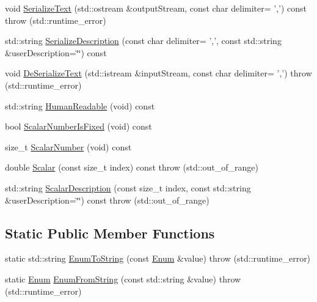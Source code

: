 \begin{DoxyCompactItemize}
\item 
void \hyperlink{classmts_component_state_a27d4817df03edad9c0fb37fd3ec5235e}{Serialize\-Text} (std\-::ostream \&output\-Stream, const char delimiter= ',') const   throw (std\-::runtime\-\_\-error)
\item 
std\-::string \hyperlink{classmts_component_state_a26daef23e5f1a036728b0b14b9e8efc0}{Serialize\-Description} (const char delimiter= ',', const std\-::string \&user\-Description=\char`\"{}\char`\"{}) const 
\item 
void \hyperlink{classmts_component_state_a5be1810d0081c6bd88eabd7ba133cd3d}{De\-Serialize\-Text} (std\-::istream \&input\-Stream, const char delimiter= ',')  throw (std\-::runtime\-\_\-error)
\item 
std\-::string \hyperlink{classmts_component_state_a372b7626577a0578549f39af8ec4f788}{Human\-Readable} (void) const 
\item 
bool \hyperlink{classmts_component_state_af8090a197fd5b545a9da6c0f4ae00bdf}{Scalar\-Number\-Is\-Fixed} (void) const 
\item 
size\-\_\-t \hyperlink{classmts_component_state_a57ed439d6865af04c20a3a561b96be9d}{Scalar\-Number} (void) const 
\item 
double \hyperlink{classmts_component_state_a65e258793958233b43d67c91fd9e3f2c}{Scalar} (const size\-\_\-t index) const   throw (std\-::out\-\_\-of\-\_\-range)
\item 
std\-::string \hyperlink{classmts_component_state_ac6de4699d77e38e562e7fa887524d77b}{Scalar\-Description} (const size\-\_\-t index, const std\-::string \&user\-Description=\char`\"{}\char`\"{}) const   throw (std\-::out\-\_\-of\-\_\-range)
\end{DoxyCompactItemize}
\subsection*{Static Public Member Functions}
\begin{DoxyCompactItemize}
\item 
static std\-::string \hyperlink{classmts_component_state_a5ca8cf9c8a890e2b25accfc4876701bf}{Enum\-To\-String} (const \hyperlink{classmts_component_state_a1158e4d2d79fff671354909e87f58928}{Enum} \&value)  throw (std\-::runtime\-\_\-error)
\item 
static \hyperlink{classmts_component_state_a1158e4d2d79fff671354909e87f58928}{Enum} \hyperlink{classmts_component_state_a2ee830f3b77c18252834530063aa1250}{Enum\-From\-String} (const std\-::string \&value)  throw (std\-::runtime\-\_\-error)
\end{DoxyCompactItemize}
